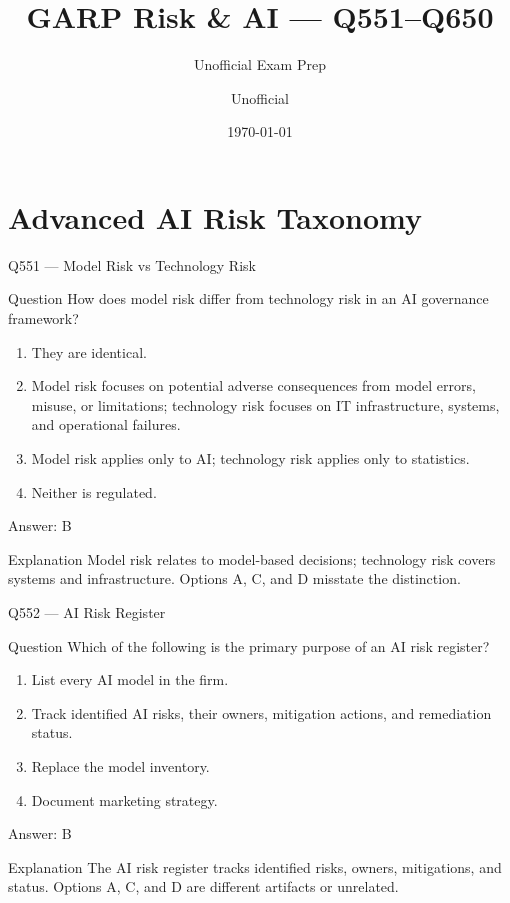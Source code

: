 \documentclass[aspectratio=169,8pt]{beamer}
\title[GARP RAI]{GARP Risk \& AI --- Q551--Q650}
\subtitle{Unofficial Exam Prep}
\author{Unofficial}
\date{\today}
\begin{document}
	
	\begin{frame}
		\titlepage
	\end{frame}
	
	\section{Advanced AI Risk Taxonomy}
	
	\begin{frame}{Q551 --- Model Risk vs Technology Risk}
		\begin{block}{Question}
			How does model risk differ from technology risk in an AI governance framework?
			\begin{enumerate}
				\item They are identical.
				\item Model risk focuses on potential adverse consequences from model errors, misuse, or limitations; technology risk focuses on IT infrastructure, systems, and operational failures.
				\item Model risk applies only to AI; technology risk applies only to statistics.
				\item Neither is regulated.
			\end{enumerate}
		\end{block}
		\begin{exampleblock}{Answer: B}\end{exampleblock}
		\begin{block}{Explanation}
			Model risk relates to model-based decisions; technology risk covers systems and infrastructure. Options A, C, and D misstate the distinction.
		\end{block}
	\end{frame}
	
	\begin{frame}{Q552 --- AI Risk Register}
		\begin{block}{Question}
			Which of the following is the primary purpose of an AI risk register?
			\begin{enumerate}
				\item List every AI model in the firm.
				\item Track identified AI risks, their owners, mitigation actions, and remediation status.
				\item Replace the model inventory.
				\item Document marketing strategy.
			\end{enumerate}
		\end{block}
		\begin{exampleblock}{Answer: B}\end{exampleblock}
		\begin{block}{Explanation}
			The AI risk register tracks identified risks, owners, mitigations, and status. Options A, C, and D are different artifacts or unrelated.
		\end{block}
	\end{frame}
	
\end{document}
